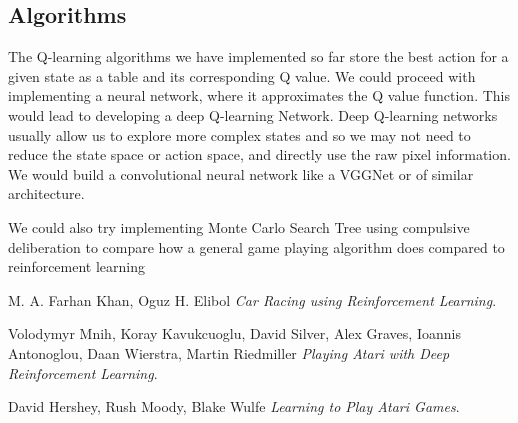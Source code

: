 \documentclass[10pt,twocolumn,letterpaper]{article}
\begin{document}
\subsection*{Algorithms}
The Q-learning algorithms we have implemented so far store the best action for a given state as a table and its corresponding Q value. We could proceed with implementing a neural network, where it approximates the Q value function. This would lead to developing a deep Q-learning Network. Deep Q-learning networks usually allow us to explore more complex states and so we may not need to reduce the state space or action space, and directly use the raw pixel information. We would build a convolutional neural network like a VGGNet or of similar architecture.  

We could also try implementing Monte Carlo Search Tree using compulsive deliberation to compare how a general game playing algorithm does compared to reinforcement learning 


\begin{thebibliography}{9}
M. A. Farhan Khan, Oguz H. Elibol
\textit{Car Racing using Reinforcement Learning}. 

 
Volodymyr Mnih, Koray Kavukcuoglu, David Silver, Alex Graves, Ioannis Antonoglou,
Daan Wierstra, Martin Riedmiller
\textit{Playing Atari with Deep Reinforcement Learning}. 


David Hershey, Rush Moody, Blake Wulfe
\textit{Learning to Play Atari Games}. 

\end{thebibliography}
\end{document}
